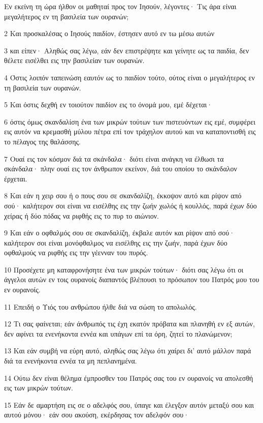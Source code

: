 \par Εν εκείνη τη ώρα ήλθον οι μαθηταί προς τον Ιησούν, λέγοντες· Τις άρα είναι μεγαλήτερος εν τη βασιλεία των ουρανών;
\par 2 Και προσκαλέσας ο Ιησούς παιδίον, έστησεν αυτό εν τω μέσω αυτών
\par 3 και είπεν· Αληθώς σας λέγω, εάν δεν επιστρέψητε και γείνητε ως τα παιδία, δεν θέλετε εισέλθει εις την βασιλείαν των ουρανών.
\par 4 Όστις λοιπόν ταπεινώση εαυτόν ως το παιδίον τούτο, ούτος είναι ο μεγαλήτερος εν τη βασιλεία των ουρανών.
\par 5 Και όστις δεχθή εν τοιούτον παιδίον εις το όνομά μου, εμέ δέχεται·
\par 6 όστις όμως σκανδαλίση ένα των μικρών τούτων των πιστευόντων εις εμέ, συμφέρει εις αυτόν να κρεμασθή μύλου πέτρα επί τον τράχηλον αυτού και να καταποντισθή εις το πέλαγος της θαλάσσης.
\par 7 Ουαί εις τον κόσμον διά τα σκάνδαλα· διότι είναι ανάγκη να έλθωσι τα σκάνδαλα· πλην ουαί εις τον άνθρωπον εκείνον, διά του οποίου το σκάνδαλον έρχεται.
\par 8 Και εάν η χειρ σου ή ο πους σου σε σκανδαλίζη, έκκοψον αυτό και ρίψον από σού· καλήτερον σοι είναι να εισέλθης εις την ζωήν χωλός ή κουλλός, παρά έχων δύο χείρας ή δύο πόδας να ριφθής εις το πυρ το αιώνιον.
\par 9 Και εάν ο οφθαλμός σου σε σκανδαλίζη, έκβαλε αυτόν και ρίψον από σού· καλήτερον σοι είναι μονόφθαλμος να εισέλθης εις την ζωήν, παρά έχων δύο οφθαλμούς να ριφθής εις την γέενναν του πυρός.
\par 10 Προσέχετε μη καταφρονήσητε ένα των μικρών τούτων· διότι σας λέγω ότι οι άγγελοι αυτών εν τοις ουρανοίς διαπαντός βλέπουσι το πρόσωπον του Πατρός μου του εν ουρανοίς.
\par 11 Επειδή ο Υιός του ανθρώπου ήλθε διά να σώση το απολωλός.
\par 12 Τι σας φαίνεται; εάν άνθρωπός τις έχη εκατόν πρόβατα και πλανηθή εν εξ αυτών, δεν αφίνει τα ενενήκοντα εννέα και υπάγων επί τα όρη, ζητεί το πλανώμενον;
\par 13 Και εάν συμβή να εύρη αυτό, αληθώς σας λέγω ότι χαίρει δι' αυτό μάλλον παρά διά τα ενενήκοντα εννέα τα μη πεπλανημένα.
\par 14 Ούτω δεν είναι θέλημα έμπροσθεν του Πατρός σας του εν ουρανοίς να απολεσθή εις των μικρών τούτων.
\par 15 Εάν δε αμαρτήση εις σε ο αδελφός σου, ύπαγε και έλεγξον αυτόν μεταξύ σου και αυτού μόνου· εάν σου ακούση, εκέρδησας τον αδελφόν σου·
